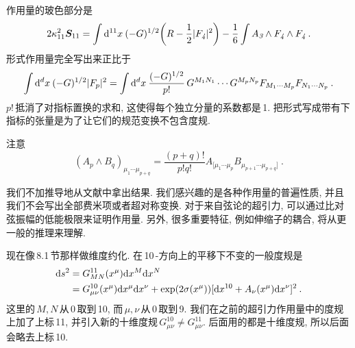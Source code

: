 作用量的玻色部分是
\begin{equation}
    2\kappa_{11}^{2}\bm{S}_{11}=\int\mathrm{d}^{11}x\:(-G)^{1/2}\biggl(R-\frac{1}{2}\lvert F_{\textit{4}}\rvert^{2}\biggr)-\frac{1}{6}\int A_{\textit{3}}\wedge F_{\textit{4}}\wedge F_{\textit{4}} \:. \label{12.1.1}
\end{equation}
形式作用量完全写出来正比于
\begin{equation}
    \int\mathrm{d}^{d}x\:(-G)^{1/2}\lvert F_{p}\rvert^{2} = \int \mathrm{d}^{d}x\:\frac{(-G)^{1/2}}{p!}\,G^{M_{1}N_{1}}\cdots G^{M_{p}N_{p}}F_{M_{1}\cdots M_{p}}F_{N_{1}\cdots N_{p}} \:. \label{12.1.2}
\end{equation}
$p!\,$抵消了对指标置换的求和, 这使得每个独立分量的系数都是\,1.  把形式写成带有下指标的张量是为了让它们的规范变换不包含度规.
\begin{tcolorbox}
    注意
    \[(A_{p}\wedge B_{q})_{\mu_{1}\cdots\mu_{p+q}} = \frac{(p+q)!}{p!q!}A_{[\mu_{1}\cdots \mu_{p}}B_{\mu_{p+1}\cdots\mu_{p+q}]} \:.\]
\end{tcolorbox}

我们不加推导地从文献中拿出结果. 我们感兴趣的是各种作用量的普遍性质, 并且我们不会写出全部费米项或者超对称变换. 对于来自弦论的超引力, 可以通过比对弦振幅的低能极限来证明作用量. 另外, 很多重要特征, 例如伸缩子的耦合, 将从更一般的推理来理解.

现在像\,8.1\,节那样做维度约化. 在\,10\,-方向上的平移下不变的一般度规是
\begin{align}
    \mathrm{d} s^{2} &= G_{MN}^{11}(x^{\mu})\mathrm{d} x^{M}\mathrm{d} x^{N} \nonumber \\
    &= G_{\mu\nu}^{10}(x^{\mu})\mathrm{d} x^{\mu}\mathrm{d} x^{\nu} + \exp(2\sigma(x^{\mu}))[\mathrm{d} x^{10}+A_{\nu}(x^{\mu})\mathrm{d} x^{\nu}]^{2} \:. \label{12.1.3}
\end{align}
这里的\,$M,N$\,从\,0\,取到\,10, 而$\,\mu,\nu\,$从\,0\,取到\,9. 我们在之前的超引力作用量中的度规上加了上标\,11, 并引入新的十维度规$\,G_{\mu\nu}^{10}\neq G_{\mu\nu}^{11}$. 后面用的都是十维度规, 所以后面会略去上标\,10.

